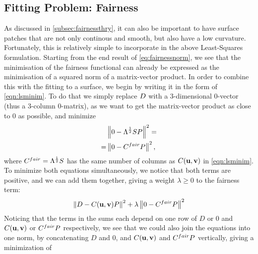 \subsection{Fitting Problem: Fairness}
As discussed in \autoref{subsec:fairnessthry}, it can also be important to have surface patches that are not only continous and smooth, but also have a low curvature. Fortunately, this is relatively simple to incorporate in the above Least-Squares formulation. Starting from the end result of \autoref{eq:fairnessnorm}, we see that the minimisation of the fairness functional can already be expressed as the minimisation of a squared norm of a matrix-vector product. In order to combine this with the fitting to a surface, we begin by writing it in the form of \autoref{eqn:lsminim}. To do that we simply replace $\lsDataPointMatrix$ with a 3-dimensional $0$-vector (thus a 3-column $0$-matrix), as we want to get the matrix-vector product as close to $0$ as possible, and minimize
\begin{align*}
\phantom{=}& \norm{0 - \Lambda^{\frac{1}{2}} S \lsControlPointMatrix}^2 =
\\
=& \norm{0 - \lsControlPointCoefMatrix^{fair}\lsControlPointMatrix}^2,
\end{align*}
where $\lsControlPointCoefMatrix^{fair} = \Lambda^{\frac{1}{2}} S$ has the same number of columns as $\lsControlPointCoefMatrix(\vec{u},\vec{v})$ in \autoref{eqn:lsminim}. %
To minimize both equations simultaneously, we notice that both terms are positive, and we can add them together, giving a weight $\lambda \geq 0$ to the fairness term:
\begin{equation}
\norm{\lsDataPointMatrix - \lsControlPointCoefMatrix(\vec{u},\vec{v}) \lsControlPointMatrix }^2 + \lambda \norm{0 - \lsControlPointCoefMatrix^{fair}\lsControlPointMatrix }^2
\end{equation}
Noticing that the terms in the sums each depend on one row of $D$ or $0$ and $\lsControlPointCoefMatrix(\vec{u},\vec{v})$ or $\lsControlPointCoefMatrix^{fair}\lsControlPointMatrix$ respectively, we see that we could also join the equations into one norm, by concatenating $D$ and $0$, and $\lsControlPointCoefMatrix(\vec{u},\vec{v})$ and $\lsControlPointCoefMatrix^{fair}\lsControlPointMatrix$ vertically, giving a minimization of
